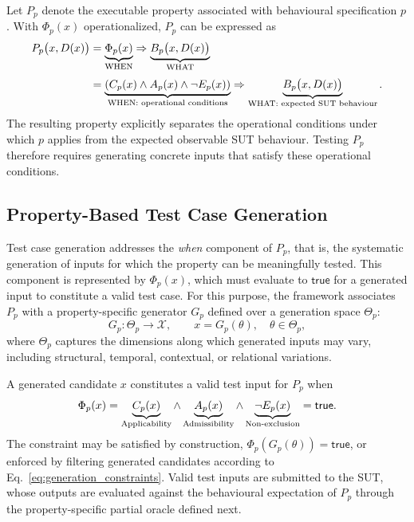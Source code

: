 \documentclass[preprint,12pt]{elsarticle}
\begin{document}
Let \(P_p\) denote the executable property associated with
behavioural specification \(p\). With \(\Phi_p(x)\) operationalized,
\(P_p\) can be expressed as
\begin{equation}
\begin{aligned}
P_p\bigl(x,D(x)\bigr)
&=
\underbrace{\Phi_p(x)}_{\text{\scriptsize WHEN}}
\Rightarrow
\underbrace{B_p\bigl(x,D(x)\bigr)}_{\text{\scriptsize WHAT}}
\\[1mm]
&=
\underbrace{
\left(
C_p(x)\land A_p(x)\land\neg E_p(x)
\right)
}_{\text{\scriptsize WHEN: operational conditions}}
\Rightarrow
\underbrace{
B_p\bigl(x,D(x)\bigr)
}_{\text{\scriptsize WHAT: expected SUT behaviour}}.
\end{aligned}
\label{eq:executable_property}
\end{equation}
The resulting property explicitly separates the operational conditions under
which \(p\) applies from the expected observable SUT behaviour. Testing \(P_p\) therefore requires generating concrete inputs that satisfy
these operational conditions.

\subsection{Property-Based Test Case Generation}
\label{sec:test_generation}

Test case generation addresses the \emph{when} component of \(P_p\), that is,
the systematic generation of inputs for which the property can be meaningfully
tested. This component is represented by \(\Phi_p(x)\), which must evaluate
to \(\mathsf{true}\) for a generated input to constitute a valid test case.
For this purpose, the framework associates \(P_p\) with a property-specific
generator \(G_p\) defined over a generation space \(\Theta_p\):
\begin{equation}
    G_p : \Theta_p \rightarrow \mathcal{X},
    \qquad
    x = G_p(\theta), \quad \theta \in \Theta_p,
    \label{eq:property_generator}
\end{equation}
where \(\Theta_p\) captures the dimensions along which generated inputs may
vary, including structural, temporal, contextual, or relational variations.

A generated candidate \(x\) constitutes a valid test input for \(P_p\) when
\begin{equation}
    \Phi_p(x)
    =
    \underbrace{C_p(x)}_{\text{\scriptsize Applicability}}
    \land
    \underbrace{A_p(x)}_{\text{\scriptsize Admissibility}}
    \land
    \underbrace{\neg E_p(x)}_{\text{\scriptsize Non-exclusion}}
    =
    \mathsf{true}.
    \label{eq:generation_constraints}
\end{equation}
The constraint may be satisfied by construction,
\(\Phi_p(G_p(\theta))=\mathsf{true}\), or enforced by filtering generated
candidates according to Eq.~\ref{eq:generation_constraints}. Valid test
inputs are submitted to the SUT, whose outputs are evaluated against the
behavioural expectation of \(P_p\) through the property-specific partial
oracle defined next.
\end{document}
